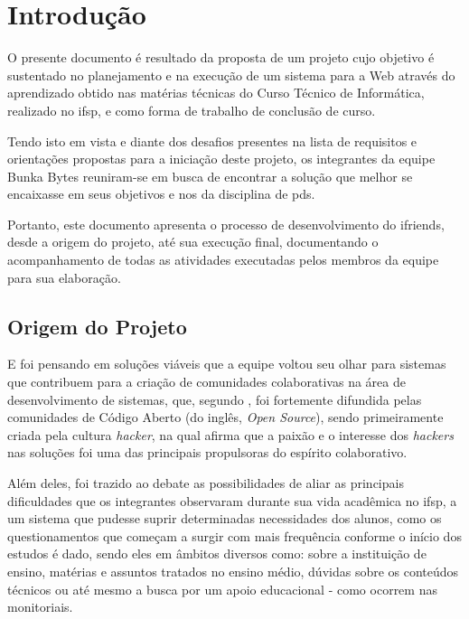 
\chapter{Introdução}
O presente documento é resultado da proposta de um projeto cujo objetivo é sustentado no planejamento e na execução de um sistema para a Web através do aprendizado obtido nas matérias técnicas do Curso Técnico de Informática, realizado no \acs{ifsp}, e como forma de trabalho de conclusão de curso.

Tendo isto em vista e diante dos desafios presentes na lista de requisitos e orientações propostas para a iniciação deste projeto, os integrantes da equipe Bunka Bytes reuniram-se em busca de encontrar a solução que melhor se encaixasse em seus objetivos e nos da disciplina de \acs{pds}.

Portanto, este documento apresenta o processo de desenvolvimento do \gls{ifriends}, desde a origem do projeto, até sua execução final, documentando o acompanhamento de todas as atividades executadas pelos membros da equipe para sua elaboração. 

\section{Origem do Projeto}
E foi pensando em soluções viáveis que a equipe voltou seu olhar para sistemas que contribuem para a criação de comunidades colaborativas na área de desenvolvimento de sistemas, que, segundo , foi fortemente difundida pelas comunidades de Código Aberto (do inglês, \textsl{Open Source}), sendo primeiramente criada pela cultura \textsl{hacker}, na qual afirma que a paixão e o interesse dos \textsl{hackers} nas soluções foi uma das principais propulsoras do espírito colaborativo.

Além deles, foi trazido ao debate as possibilidades de aliar as principais dificuldades que os integrantes observaram durante sua vida acadêmica no \acs{ifsp}, a um sistema que pudesse suprir determinadas necessidades dos alunos, como os questionamentos que começam a surgir com mais frequência conforme o início dos estudos é dado, sendo eles em âmbitos diversos como: sobre a instituição de ensino, matérias e assuntos tratados no ensino médio, dúvidas sobre os conteúdos técnicos ou até mesmo a busca por um apoio educacional - como ocorrem nas monitoriais. 

